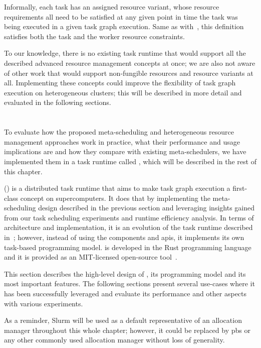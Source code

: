\vspace{1mm}Informally, each task has an assigned resource variant, whose resource requirements
all need to be satisfied at any given point in time the task was being executed in a given
task graph execution. Same as with~, this definition satisfies both the task
and the worker resource constraints.

To our knowledge, there is no existing task runtime that would support all the described advanced
resource management concepts at once; we are also not aware of other work that would support
non-fungible resources and resource variants at all. Implementing these concepts could improve the
flexibility of task graph execution on heterogeneous clusters; this will be described in more
detail and evaluated in the following sections.

\section{\hyperqueue{}}
\label{sec:hyperqueue}
To evaluate how the proposed meta-scheduling and heterogeneous resource management approaches work
in practice, what their performance and usage implications are and how they compare with existing
meta-schedulers, we have implemented them in a task runtime called \hyperqueue{}, which
will be described in the rest of this chapter.

\hyperqueue{} (\hq{}) is a distributed task runtime that aims to make task graph execution a
first-class concept on supercomputers. It does that by implementing the meta-scheduling design
described in the previous section and leveraging insights gained from our task scheduling
experiments and \dask{} runtime efficiency analysis. In terms of architecture and
implementation, it is an evolution of the \rsds{} task runtime described
in~; however, instead of using the \dask{} components and
\glspl{api}, it implements its own task-based programming model.
\hyperqueue{} is developed in the Rust programming language~\cite{rust} and
it is provided as an \mbox{MIT-licensed} open-source tool~\cite{hq_github}.

This section describes the high-level design of \hyperqueue{}, its programming model and
its most important features. The following sections present several use-cases where it has been
successfully leveraged and evaluate its performance and other aspects with various experiments.

As a reminder, Slurm will be used as a default representative of an allocation manager throughout
this whole chapter; however, it could be replaced by \gls{pbs} or any other commonly
used allocation manager without loss of generality.


